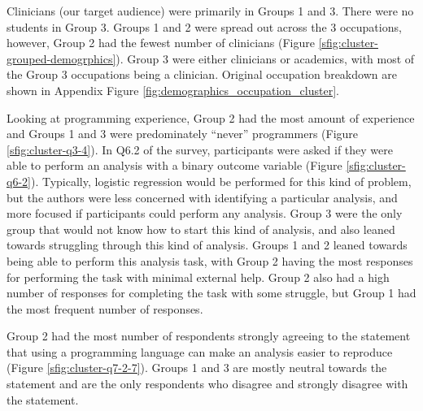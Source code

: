 \documentclass[020-persona\_validation.tex]{subfiles}
\begin{document}
        Clinicians (our target audience) were primarily in Groups 1 and 3.
        There were no students in Group 3.
        Groups 1 and 2 were spread out across the 3 occupations,
        however,
        Group 2 had the fewest number of clinicians (Figure \ref{sfig:cluster-grouped-demogrphics}).
        Group 3 were either clinicians or academics, with most of the Group 3 occupations being a clinician.
        Original occupation breakdown are shown in Appendix Figure \ref{fig:demographics_occupation_cluster}.

        Looking at programming experience, Group 2 had the most amount of experience
        and Groups 1 and 3 were predominately ``never'' programmers (Figure \ref{sfig:cluster-q3-4}).
        In Q6.2 of the survey,
        participants were asked if they were able to perform an analysis with a binary outcome variable (Figure \ref{sfig:cluster-q6-2}).
        Typically, logistic regression would be performed for this kind of problem,
        but the authors were less concerned with identifying a particular analysis,
        and more focused if participants could perform any analysis.
        Group 3 were the only group that would not know how to start this kind of analysis,
        and also leaned towards struggling through this kind of analysis.
        Groups 1 and 2 leaned towards being able to perform this analysis task,
        with Group 2 having the most responses for performing the task with minimal external help.
        Group 2 also had a high number of responses for completing the task with some struggle,
        but Group 1 had the most frequent number of responses.

        Group 2 had the most number of respondents strongly agreeing to the statement that
        using a programming language can make an analysis easier to reproduce (Figure \ref{sfig:cluster-q7-2-7}).
        Groups 1 and 3 are mostly neutral towards the statement and are the only respondents who disagree and strongly disagree
        with the statement.
\end{document}
